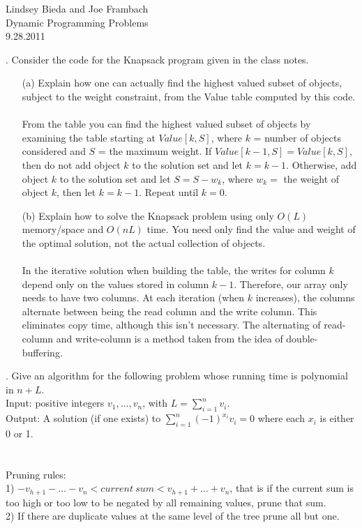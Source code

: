 \documentclass[10pt]{article}
\begin{document}
	\begin{flushright}
	Lindsey Bieda and Joe Frambach\\
	Dynamic Programming Problems\\
	9.28.2011
	\end{flushright}
	. 	Consider the code for the Knapsack program given in the class notes.
	\begin{enumerate}
	\item[(a)]	Explain how one can actually find the highest valued subset of objects, subject to the weight
							constraint, from the Value table computed by this code.\\
							\\
							From the table you can find the highest valued subset of objects by examining the table starting
							at $Value[k,S]$, where $k$ = number of objects considered and $S$ = the maximum weight. If
							$Value[k-1,S] = Value[k,S]$, then do not add object $k$ to the solution set and let $k = k - 1$. 
							Otherwise, add object $k$ to the solution set and let $S=S-w_k$, where $w_k = $
							the weight of object $k$, then let $k=k-1$. Repeat until $k=0$.
	\item[(b)]	Explain how to solve the Knapsack problem using only $O(L)$ memory/space and $O(nL)$ time. You
							need only find the value and weight of the optimal solution, not the actual collection of objects.\\
							\\
							In the iterative solution when building the table, the writes for column $k$ depend only on the values
							stored in column $k-1$. Therefore, our array only needs to have two columns. At each iteration (when $k$ increases),
							the columns alternate between being the read column and the write column. This eliminates copy time, although
							this isn't necessary. The alternating of read-column and write-column is a method taken from the idea of
							double-buffering.
	\end{enumerate}
	
	.	Give an algorithm for the following problem whose running time is polynomial in $n + L$.\\
			Input: positive integers $v_1, \ldots, v_n$, with $L = \sum_{i=1}^n v_i$.\\
			Output: A solution (if one exists) to $\sum_{i=1}^n (-1)^{x_i} v_i = 0$ where each $x_i$ is either 0 or 1.\\
			\\
			\\
			Pruning rules:\\
			1) $-v_{h+1} - \ldots - v_n < current~sum < v_{h+1} + \ldots + v_n$, that is if the current sum is too high
			or too low to be negated by all remaining values, prune that sum.\\
			2) If there are duplicate values at the same level of the tree prune all but one.\\
			\\
			
\end{document}
